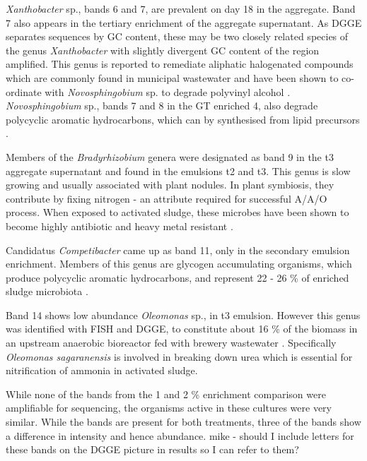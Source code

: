 \documentclass[11pt]{article}
\begin{document}
\emph{Xanthobacter} sp., bands 6 and 7, are prevalent on day 18 in the aggregate. Band 7 also appears in the tertiary enrichment of the aggregate supernatant. As DGGE separates sequences by GC content, these may be two closely related species of the genus \emph{Xanthobacter} with slightly divergent GC content of the region amplified. This genus is reported to remediate aliphatic halogenated compounds which are commonly found in municipal wastewater \cite{janssen1985degradation} and have been shown to co-ordinate with \emph{Novosphingobium} sp. to degrade polyvinyl alcohol \cite{rong2009symbiotic}. \emph{Novosphingobium} sp., bands 7 and 8 in the GT enriched  4, also degrade polycyclic aromatic hydrocarbons, which can by synthesised from lipid precursors \cite{addison2007novosphingobium}.


Members of the \emph{Bradyrhizobium} genera were designated as band 9 in the t3 aggregate supernatant and found in the emulsions t2 and t3. This genus is slow growing \cite{rebah2002wastewater} and usually associated with plant nodules. In plant symbiosis, they contribute by fixing nitrogen - an attribute required for successful A/A/O process. When exposed to activated sludge, these microbes have been shown to become highly antibiotic and heavy metal resistant \cite{ahmad17samiullah}.


Candidatus \emph{Competibacter} came up as band 11, only in the secondary emulsion enrichment. Members of this genus are glycogen accumulating organisms, which produce polycyclic aromatic hydrocarbons, and represent 22 - 26 \% of enriched sludge microbiota \cite{bengtsson2008production,lemaire2008microbial}. 


Band 14 shows low abundance \emph{Oleomonas} sp., in t3 emulsion. However this genus was identified with FISH and DGGE, to constitute about 16 \% of the biomass in an upstream anaerobic bioreactor fed with brewery wastewater \cite{fernandez2008analysis}. Specifically \emph{Oleomonas sagaranensis} is involved in breaking down urea \cite{kanamori2005allophanate,kanamori2004enzymatic} which is essential for nitrification of ammonia in activated sludge.


While none of the bands from the 1 and 2 \% enrichment comparison were amplifiable for sequencing, the organisms active in these cultures were very similar. While the bands are present for both treatments, three of the bands show a difference in intensity and hence abundance.
mike - should I include letters for these bands on the DGGE picture in results so I can refer to them?
\end{document}
